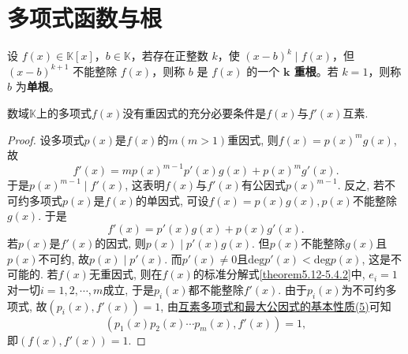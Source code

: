 \documentclass[lang=cn,newtx,10pt,scheme=chinese]{elegantbook}
\begin{document}
\section{多项式函数与根}

\begin{definition}[多项式的重根]\label{definition:多项式的重根}
设 $f(x) \in \mathbb{K}[x]$，$b \in \mathbb{K}$，若存在正整数 $k$，使 $(x - b)^k \mid f(x)$，但 $(x - b)^{k+1}$ 不能整除 $f(x)$，则称 $b$ 是 $f(x)$ 的一个 \textbf{$\boldsymbol{k}$ 重根}。若 $k = 1$，则称 $b$ 为\textbf{单根}。
\end{definition}

\begin{theorem}[多项式没有重因式的充要条件]\label{theorem:多项式没有重因式的充要条件}
数域\(\mathbb{K}\)上的多项式\(f(x)\)没有重因式的充分必要条件是\(f(x)\)与\(f'(x)\)互素.
\end{theorem}
\begin{proof}
设多项式\(p(x)\)是\(f(x)\)的\(m(m > 1)\)重因式, 则\(f(x)=p(x)^mg(x)\), 故
\[
f'(x)=mp(x)^{m - 1}p'(x)g(x)+p(x)^mg'(x).
\]
于是\(p(x)^{m - 1}\mid f'(x)\), 这表明\(f(x)\)与\(f'(x)\)有公因式\(p(x)^{m - 1}\).
反之, 若不可约多项式\(p(x)\)是\(f(x)\)的单因式, 可设\(f(x)=p(x)g(x), p(x)\)不能整除\(g(x)\). 于是
\[
f'(x)=p'(x)g(x)+p(x)g'(x).
\]
若\(p(x)\)是\(f'(x)\)的因式, 则\(p(x)\mid p'(x)g(x)\). 但\(p(x)\)不能整除\(g(x)\)且\(p(x)\)不可约, 故\(p(x)\mid p'(x)\). 而\(p'(x)\neq 0\)且\(\mathrm{deg }p'(x)<\mathrm{deg }p(x)\), 这是不可能的. 若\(f(x)\)无重因式, 则在\(f(x)\)的标准分解式\eqref{theorem5.12-5.4.2}中, \(e_i = 1\)对一切\(i = 1,2,\cdots,m\)成立, 于是\(p_i(x)\)都不能整除\(f'(x)\). 由于\(p_i(x)\)为不可约多项式, 故\((p_i(x),f'(x)) = 1\), 由\hyperref[proposition:互素多项式和最大公因式的基本性质]{互素多项式和最大公因式的基本性质(5)}可知
\[
(p_1(x)p_2(x)\cdots p_m(x),f'(x)) = 1,
\]
即\((f(x),f'(x)) = 1\).
\end{proof}
\end{document}
